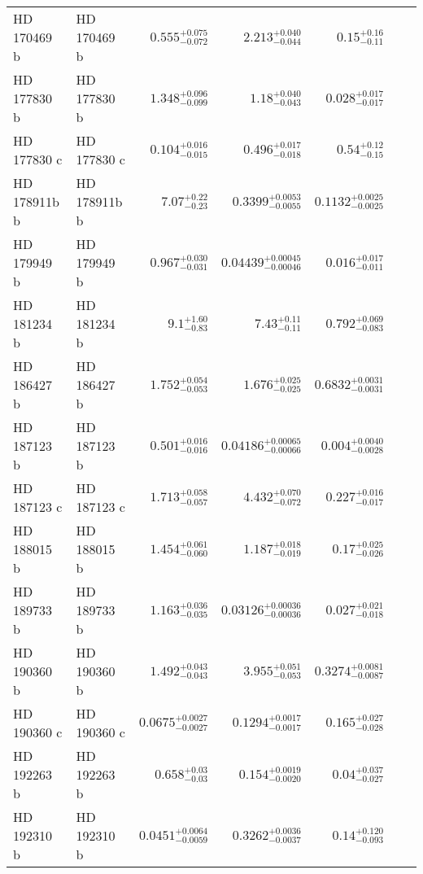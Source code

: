 \begin{longtable*}{llrrrrr}
HD 170469 b & HD 170469 b & $0.555^{+0.075}_{-0.072}$ & $2.213^{+0.040}_{-0.044}$ & $0.15^{+0.16}_{-0.11}$ & \cite{Fischer07} & \\ 
HD 177830 b & HD 177830 b & $1.348^{+0.096}_{-0.099}$ & $1.18^{+0.040}_{-0.043}$ & $0.028^{+0.017}_{-0.017}$ & \cite{Butler06} & \\ 
HD 177830 c & HD 177830 c & $0.104^{+0.016}_{-0.015}$ & $0.496^{+0.017}_{-0.018}$ & $0.54^{+0.12}_{-0.15}$ & \cite{Meschiari11} & \\ 
HD 178911b b & HD 178911b b & $7.07^{+0.22}_{-0.23}$ & $0.3399^{+0.0053}_{-0.0055}$ & $0.1132^{+0.0025}_{-0.0025}$ & \cite{Zucker02} & \\ 
HD 179949 b & HD 179949 b & $0.967^{+0.030}_{-0.031}$ & $0.04439^{+0.00045}_{-0.00046}$ & $0.016^{+0.017}_{-0.011}$ & \cite{Tiney01} & \\ 
HD 181234 b & HD 181234 b & $9.1^{+1.60}_{-0.83}$ & $7.43^{+0.11}_{-0.11}$ & $0.792^{+0.069}_{-0.083}$ & \cite{Rickman19} & \\ 
HD 186427 b & HD 186427 b & $1.752^{+0.054}_{-0.053}$ & $1.676^{+0.025}_{-0.025}$ & $0.6832^{+0.0031}_{-0.0031}$ & \cite{Chochran97} & \\ 
HD 187123 b & HD 187123 b & $0.501^{+0.016}_{-0.016}$ & $0.04186^{+0.00065}_{-0.00066}$ & $0.004^{+0.0040}_{-0.0028}$ & \cite{Vogt00} & \\ 
HD 187123 c & HD 187123 c & $1.713^{+0.058}_{-0.057}$ & $4.432^{+0.070}_{-0.072}$ & $0.227^{+0.016}_{-0.017}$ & \cite{Wright09} & \\ 
HD 188015 b & HD 188015 b & $1.454^{+0.061}_{-0.060}$ & $1.187^{+0.018}_{-0.019}$ & $0.17^{+0.025}_{-0.026}$ & \cite{Marcy05} & \\ 
HD 189733 b & HD 189733 b & $1.163^{+0.036}_{-0.035}$ & $0.03126^{+0.00036}_{-0.00036}$ & $0.027^{+0.021}_{-0.018}$ & \cite{Bouchy05} & \\ 
HD 190360 b & HD 190360 b & $1.492^{+0.043}_{-0.043}$ & $3.955^{+0.051}_{-0.053}$ & $0.3274^{+0.0081}_{-0.0087}$ & \cite{Naef03} & \\ 
HD 190360 c & HD 190360 c & $0.0675^{+0.0027}_{-0.0027}$ & $0.1294^{+0.0017}_{-0.0017}$ & $0.165^{+0.027}_{-0.028}$ & \cite{Vogt05} & \\ 
HD 192263 b & HD 192263 b & $0.658^{+0.03}_{-0.03}$ & $0.154^{+0.0019}_{-0.0020}$ & $0.04^{+0.037}_{-0.027}$ & \cite{Santos00} & \\ 
HD 192310 b & HD 192310 b & $0.0451^{+0.0064}_{-0.0059}$ & $0.3262^{+0.0036}_{-0.0037}$ & $0.14^{+0.120}_{-0.093}$ & \cite{Howard11} & \\ 

\end{longtable*}
